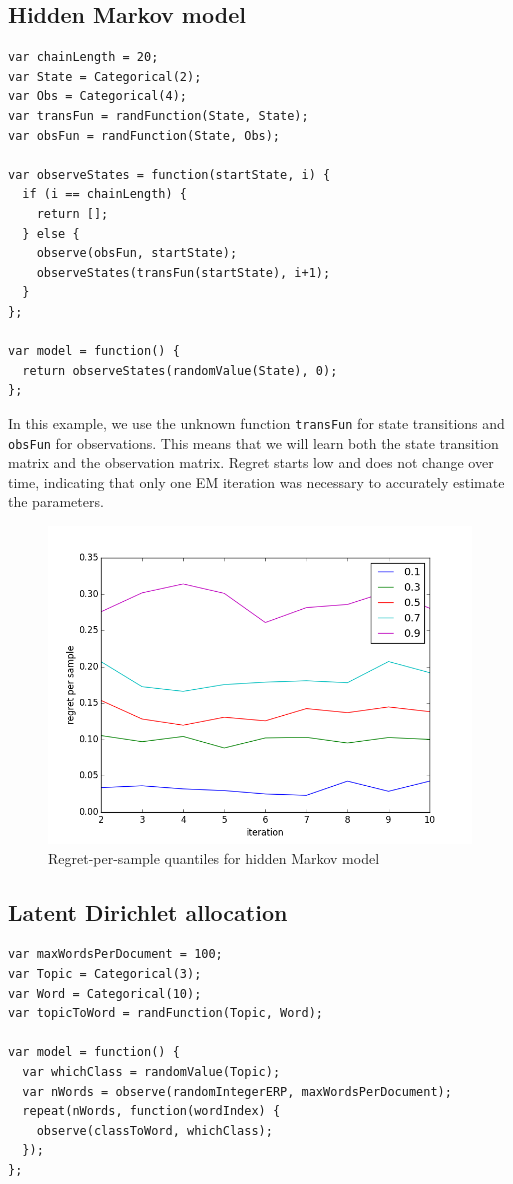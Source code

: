 \documentclass{article}
\begin{document}
\FloatBarrier
  \subsection{Hidden Markov model}
{\small
\begin{lstlisting}
var chainLength = 20;
var State = Categorical(2);
var Obs = Categorical(4);
var transFun = randFunction(State, State);
var obsFun = randFunction(State, Obs);

var observeStates = function(startState, i) {
  if (i == chainLength) {
    return [];
  } else {
    observe(obsFun, startState);
    observeStates(transFun(startState), i+1);
  }
};

var model = function() {
  return observeStates(randomValue(State), 0);
};
\end{lstlisting}
}

In this example, we use the unknown function \texttt{transFun} for state transitions and \texttt{obsFun} for observations.  This means that we will learn both the state transition matrix and the observation matrix.  Regret starts low and does not change over time, indicating that only one EM iteration was necessary to accurately estimate the parameters.

  \begin{figure}[h]
\begin{center}
  \includegraphics[scale=0.5]{../plots/accuracy_hmm.png}
\end{center}
\caption{Regret-per-sample quantiles for hidden Markov model}
\end{figure}

\FloatBarrier
\subsection{Latent Dirichlet allocation}
{\small
\begin{lstlisting}
var maxWordsPerDocument = 100;
var Topic = Categorical(3);
var Word = Categorical(10);
var topicToWord = randFunction(Topic, Word);

var model = function() {
  var whichClass = randomValue(Topic);
  var nWords = observe(randomIntegerERP, maxWordsPerDocument);
  repeat(nWords, function(wordIndex) {
    observe(classToWord, whichClass);
  });
};
\end{lstlisting}
}
\end{document}
